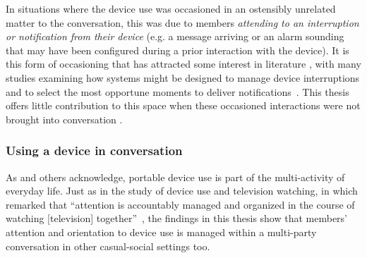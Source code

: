 In situations where the device use was occasioned in an ostensibly unrelated matter to the conversation, this was due to members \textit{attending to an interruption or notification from their device} (e.g. a message arriving or an alarm sounding that may have been configured during a prior interaction with the device).
It is this form of occasioning that has attracted some interest in literature , with many studies examining how systems might be designed to manage device interruptions and to select the most opportune moments to deliver notifications~\citep[see \ref{sec:background litreview society notifications}]{Fischer2011}.
This thesis offers little contribution to this space when these occasioned interactions were not brought into conversation .






\subsubsection{Using a device in conversation}\label{sec:synopsis discussion conduct device-use using}
As \citet{Brown2013} and others acknowledge, portable device use is part of the multi-activity of everyday life.
Just as in the study of device use and television watching, in which \citet{Rooksby2015} remarked that ``attention is accountably managed and organized in the course of watching [television] together''~\citep[p. 13]{Rooksby2015}, the findings in this thesis show that members' attention and orientation to device use is managed within a multi-party conversation in other casual-social settings too.

